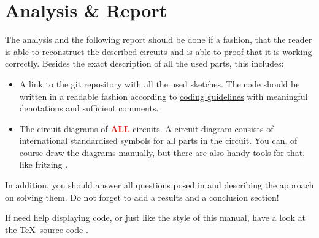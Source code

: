 \section{Analysis \& Report}

The analysis and the following report should be done if a fashion, that the reader is able to reconstruct the described circuits and is able to proof that it is working correctly. Besides the exact description of all the used parts, this includes:
%
\begin{itemize}
  \item A link to the git repository with all the used sketches. The code should be written in a readable fashion according to \href{https://gist.github.com/lefticus/10191322}{\cpp coding guidelines} with meaningful denotations and sufficient comments.
  \item The circuit diagrams of \textcolor{red}{\textbf{ALL}} circuits. A circuit diagram consists of international standardised symbols for all parts in the circuit. You can, of course draw the diagrams manually, but there are also handy tools for that, like  \eg fritzing \cite{fritz}.
\end{itemize}
%
In addition, you should answer all questions posed in  and describing the approach on solving them. Do not forget to add a results and a conclusion section!\par
%
If need help displaying code, or just like the style of this manual, have a look at the \TeX~source code \cite{man}.










